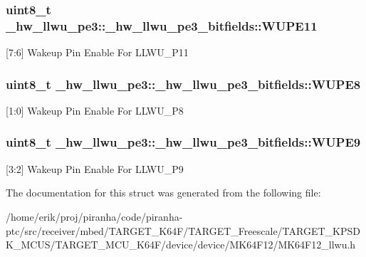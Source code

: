 \subsubsection[{\texorpdfstring{W\+U\+P\+E11}{WUPE11}}]{\setlength{\rightskip}{0pt plus 5cm}uint8\+\_\+t \+\_\+hw\+\_\+llwu\+\_\+pe3\+::\+\_\+hw\+\_\+llwu\+\_\+pe3\+\_\+bitfields\+::\+W\+U\+P\+E11}\hypertarget{struct__hw__llwu__pe3_1_1__hw__llwu__pe3__bitfields_ae95bb26546bfa7807a2504c87d960767}{}\label{struct__hw__llwu__pe3_1_1__hw__llwu__pe3__bitfields_ae95bb26546bfa7807a2504c87d960767}
\mbox{[}7\+:6\mbox{]} Wakeup Pin Enable For L\+L\+W\+U\+\_\+\+P11 
\subsubsection[{\texorpdfstring{W\+U\+P\+E8}{WUPE8}}]{\setlength{\rightskip}{0pt plus 5cm}uint8\+\_\+t \+\_\+hw\+\_\+llwu\+\_\+pe3\+::\+\_\+hw\+\_\+llwu\+\_\+pe3\+\_\+bitfields\+::\+W\+U\+P\+E8}\hypertarget{struct__hw__llwu__pe3_1_1__hw__llwu__pe3__bitfields_a7053f3489594321e08a9a05dbf66ec4a}{}\label{struct__hw__llwu__pe3_1_1__hw__llwu__pe3__bitfields_a7053f3489594321e08a9a05dbf66ec4a}
\mbox{[}1\+:0\mbox{]} Wakeup Pin Enable For L\+L\+W\+U\+\_\+\+P8 
\subsubsection[{\texorpdfstring{W\+U\+P\+E9}{WUPE9}}]{\setlength{\rightskip}{0pt plus 5cm}uint8\+\_\+t \+\_\+hw\+\_\+llwu\+\_\+pe3\+::\+\_\+hw\+\_\+llwu\+\_\+pe3\+\_\+bitfields\+::\+W\+U\+P\+E9}\hypertarget{struct__hw__llwu__pe3_1_1__hw__llwu__pe3__bitfields_a5d9eaa15f46674d331e5aa21344b5544}{}\label{struct__hw__llwu__pe3_1_1__hw__llwu__pe3__bitfields_a5d9eaa15f46674d331e5aa21344b5544}
\mbox{[}3\+:2\mbox{]} Wakeup Pin Enable For L\+L\+W\+U\+\_\+\+P9 

The documentation for this struct was generated from the following file\+:\begin{DoxyCompactItemize}
\item 
/home/erik/proj/piranha/code/piranha-\/ptc/src/receiver/mbed/\+T\+A\+R\+G\+E\+T\+\_\+\+K64\+F/\+T\+A\+R\+G\+E\+T\+\_\+\+Freescale/\+T\+A\+R\+G\+E\+T\+\_\+\+K\+P\+S\+D\+K\+\_\+\+M\+C\+U\+S/\+T\+A\+R\+G\+E\+T\+\_\+\+M\+C\+U\+\_\+\+K64\+F/device/device/\+M\+K64\+F12/M\+K64\+F12\+\_\+llwu.\+h\end{DoxyCompactItemize}
